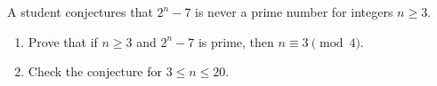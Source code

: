 A student conjectures that $2^n-7$ is never a prime number for integers $n\ge3$.
\begin{enumerate}
\item[(a)] Prove that if $n\ge3$ and $2^n-7$ is prime, then $n\equiv3\pmod4$.
\item[(b)] Check the conjecture for $3\le n\le20$.
\end{enumerate}
